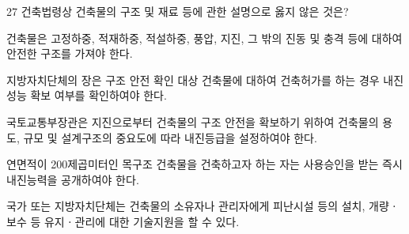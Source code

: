 \begin{question}{27}
건축법령상 건축물의 구조 및 재료 등에 관한 설명으로 옳지 않은 것은?
\begin{choices}
  \item 건축물은 고정하중, 적재하중, 적설하중, 풍압, 지진, 그 밖의 진동 및 충격 등에 대하여 안전한 구조를 가져야 한다.
  \item 지방자치단체의 장은 구조 안전 확인 대상 건축물에 대하여 건축허가를 하는 경우 내진성능 확보 여부를 확인하여야 한다.
  \item 국토교통부장관은 지진으로부터 건축물의 구조 안전을 확보하기 위하여 건축물의 용도, 규모 및 설계구조의 중요도에 따라 내진등급을 설정하여야 한다.
  \item 연면적이 200제곱미터인 목구조 건축물을 건축하고자 하는 자는 사용승인을 받는 즉시 내진능력을 공개하여야 한다.
  \item 국가 또는 지방자치단체는 건축물의 소유자나 관리자에게 피난시설 등의 설치, 개량ㆍ보수 등 유지ㆍ관리에 대한 기술지원을 할 수 있다.
\end{choices}
\end{question}
